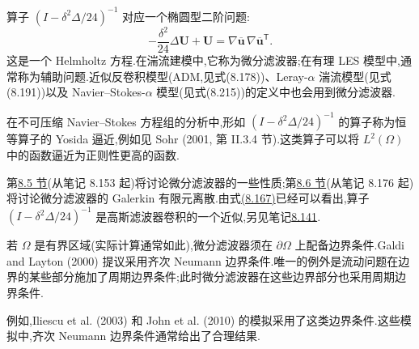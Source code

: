 \begin{note}
\label{note:les-rational-model-operator}
算子 $\left(I-\delta^2\Delta/24\right)^{-1}$ 对应一个椭圆型二阶问题:
\begin{equation}\label{eq:rational-les-auxiliary-helmholtz}
 -\frac{\delta^2}{24}\Delta\bm{U}+\bm{U}
 =\nabla\overline{\bm{u}}\,
  \nabla\overline{\bm{u}}^{\mathsf T}.
\end{equation}
这是一个 Helmholtz 方程.在湍流建模中,它称为微分滤波器;在有理 LES 模型中,通常称为辅助问题.近似反卷积模型(ADM,见式(8.178))、Leray-$\alpha$ 湍流模型(见式(8.191))以及 Navier--Stokes-$\alpha$ 模型(见式(8.215))的定义中也会用到微分滤波器.

在不可压缩 Navier--Stokes 方程组的分析中,形如 $\left(I-\delta^2\Delta/24\right)^{-1}$ 的算子称为恒等算子的 Yosida 逼近,例如见 Sohr (2001, 第 II.3.4 节).这类算子可以将 $L^2(\Omega)$ 中的函数逼近为正则性更高的函数.

第\hyperref[sec:les-approximate-deconvolution]{8.5 节}(从笔记 8.153 起)将讨论微分滤波器的一些性质;第\hyperref[sec:les-differential-filter-discretization]{8.6 节}(从笔记 8.176 起)将讨论微分滤波器的 Galerkin 有限元离散.由式\hyperref[eq:les-rational-large-cross-terms]{(8.167)}已经可以看出,算子 $\left(I-\delta^2\Delta/24\right)^{-1}$ 是高斯滤波器卷积的一个近似,另见笔记\hyperref[note:les-differential-filter-convolution-approximation]{8.141}.
\end{note}

\begin{note}[有界区域上的微分滤波器]
\label{note:les-differential-filter-bounded-domain}
若 $\Omega$ 是有界区域(实际计算通常如此),微分滤波器须在 $\partial\Omega$ 上配备边界条件.Galdi and Layton (2000) 提议采用齐次 Neumann 边界条件.唯一的例外是流动问题在边界的某些部分施加了周期边界条件;此时微分滤波器在这些边界部分也采用周期边界条件.

例如,Iliescu et al. (2003) 和 John et al. (2010) 的模拟采用了这类边界条件.这些模拟中,齐次 Neumann 边界条件通常给出了合理结果.
\end{note}

